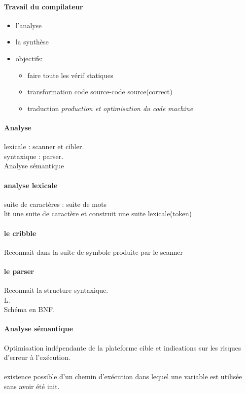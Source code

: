 \documentclass{article}
\begin{document}
\paragraph{Travail du compilateur}
\begin{itemize}
\item l'analyse
\item la synthèse
\item objectifs: 
\begin{itemize}
\item faire toute les vérif statiques
\item transformation code source-code source(correct)
\item traduction
\it production et optimisation du code machine
\end{itemize}
\end{itemize}
\paragraph{Analyse}
lexicale : scanner et cibler.\\syntaxique : parser.\\Analyse sémantique
\paragraph{analyse lexicale}
suite de caractères : suite de mots\\lit une suite de caractère et construit une suite lexicale(token)
\paragraph{le cribble}
Reconnait dans la suite de symbole produite par le scanner
\paragraph{le parser}
Reconnait la structure syntaxique.\\L.\\Schéma en BNF.

\paragraph{Analyse sémantique}
Optimisation indépendante de la plateforme cible et indications sur les risques d'erreur à l'exécution.\\\\ existence possible d'un chemin d'exécution dans lequel une variable est utilisée sans avoir été init.
\newpage
\end{document}
